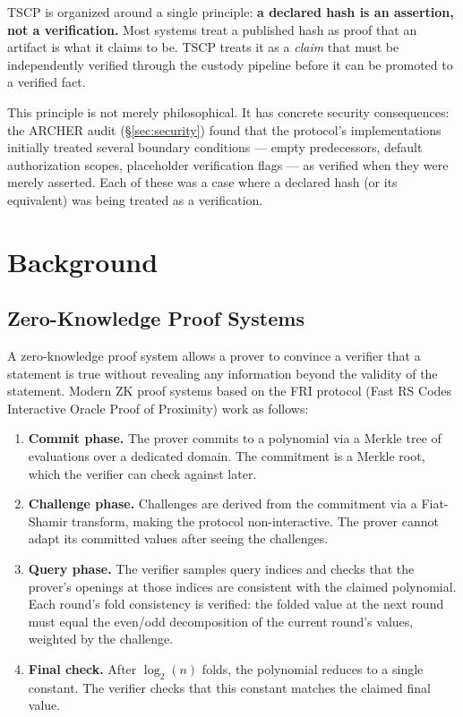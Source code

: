 \documentclass[11pt,a4paper]{article}
\begin{document}
TSCP is organized around a single principle: \textbf{a declared hash is an assertion, not a verification.} Most systems treat a published hash as proof that an artifact is what it claims to be. TSCP treats it as a \emph{claim} that must be independently verified through the custody pipeline before it can be promoted to a verified fact.

This principle is not merely philosophical. It has concrete security consequences: the ARCHER audit (\S\ref{sec:security}) found that the protocol's implementations initially treated several boundary conditions --- empty predecessors, default authorization scopes, placeholder verification flags --- as verified when they were merely asserted. Each of these was a case where a declared hash (or its equivalent) was being treated as a verification.

\section{Background}

\subsection{Zero-Knowledge Proof Systems}

A zero-knowledge proof system allows a prover to convince a verifier that a statement is true without revealing any information beyond the validity of the statement. Modern ZK proof systems based on the FRI protocol (Fast RS Codes Interactive Oracle Proof of Proximity) work as follows:

\begin{enumerate}
\item \textbf{Commit phase.} The prover commits to a polynomial via a Merkle tree of evaluations over a dedicated domain. The commitment is a Merkle root, which the verifier can check against later.
\item \textbf{Challenge phase.} Challenges are derived from the commitment via a Fiat-Shamir transform, making the protocol non-interactive. The prover cannot adapt its committed values after seeing the challenges.
\item \textbf{Query phase.} The verifier samples query indices and checks that the prover's openings at those indices are consistent with the claimed polynomial. Each round's fold consistency is verified: the folded value at the next round must equal the even/odd decomposition of the current round's values, weighted by the challenge.
\item \textbf{Final check.} After $\log_2(n)$ folds, the polynomial reduces to a single constant. The verifier checks that this constant matches the claimed final value.
\end{enumerate}
\end{document}
